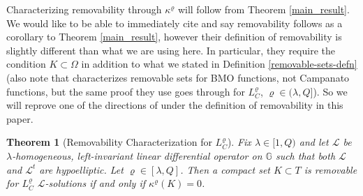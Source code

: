 \documentclass[12pt,a4paper,reqno]{amsart}
\renewcommand{\L}{\mathcal{L}}
\renewcommand{\k}{\kappa}
\renewcommand{\l}{\lambda}
\newcommand{\G}{\mathbb{G}}
\numberwithin{equation}{section}
\newtheorem{thm}{Theorem}[section]
\theoremstyle{definition}
\begin{document}
Characterizing removability through $\k^{\varrho}$ will follow from Theorem \ref{main_result}. We would like to be able to immediately cite \cite[Theorem 4.4]{CT} and say removability follows as a corollary to Theorem \ref{main_result}, however their definition of removability is slightly different than what we are using here. In particular, they require the condition $K \subset \Omega$ in addition to what we stated in Definition \ref{removable-sets-defn} (also note that \cite[Theorem 4.4]{CT} characterizes removable sets for BMO functions, not Campanato functions, but the same proof they use goes through for $L_C^{\varrho}$, $\varrho \in (\l, Q]$). So we will reprove one of the directions of \cite[Theorem 4.4]{CT} under the definition of removability in this paper.

\begin{thm}[Removability Characterization for $L_C^{\varrho}$]\label{rem-iff-hausdorff-zero}
 Fix $\l \in [1,Q)$ and let $\L$ be $\l$-homogeneous, left-invariant linear differential operator on $\G$ such that both $\L$ and $\L^t$ are hypoelliptic. Let $\varrho \in [\l, Q]$. Then a compact set $K \subset T$ is removable for $L_C^{\varrho}$ $\L$-solutions if and only if $\k^{\varrho}(K) = 0$.   
\end{thm}
\end{document}
